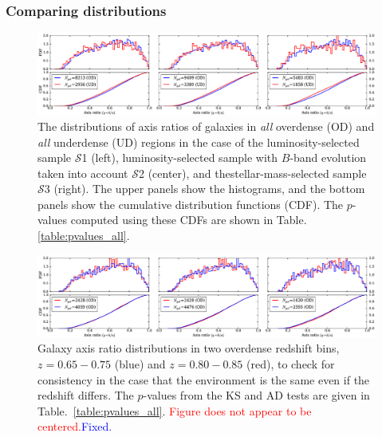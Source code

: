 \documentclass[twocolumn,useAMS,usenatbib]{mn2e}
\newcommand{\rachel}[1]{{\textcolor{red}{#1}}}
\newcommand{\arun}[1]{{\textcolor{blue}{#1}}}
\newcommand{\s}{\ensuremath{\mathcal{S}}}
\begin{document}
\subsubsection{Comparing distributions}
\label{subsubsec:compdist}
\begin{figure}
 \centering
 \includegraphics[width=2.2\columnwidth]{axis_ratio_all.eps}
 \caption{The distributions of axis ratios of galaxies in \emph{all}
   overdense (OD) and \emph{all} underdense (UD) regions in the case
   of the luminosity-selected sample \s1 (left), luminosity-selected
   sample with $B$-band evolution taken into account \s2 (center), and
   thestellar-mass-selected sample \s3 (right). The upper panels show
   the histograms, 
 and the bottom panels show the cumulative distribution functions
 (CDF). The $p$-values computed using these CDFs are shown in Table. \ref{table:pvalues_all}.}
 \label{fig:axisratio_all}
\end{figure}

\begin{figure}
 \centering
 \includegraphics[width=2.2\columnwidth]{axis_ratio_odod}
 \caption{Galaxy axis ratio
   distributions in two overdense redshift bins, $z=0.65-0.75$ (blue) and
   $z=0.80-0.85$ (red), to check for consistency in the case that the
   environment is the same even if the redshift differs. The
   $p$-values from the KS and AD tests are given in
   Table.~\ref{table:pvalues_all}. \rachel{Figure does not appear to
     be centered.}\arun{Fixed.}}
 \label{fig:axisratio_similar}
\end{figure}
\end{document}
